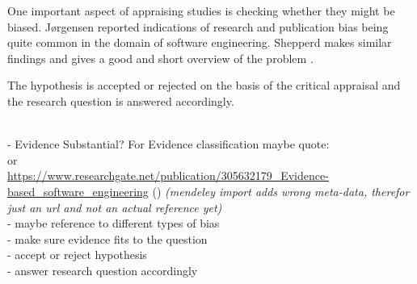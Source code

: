 One important aspect of appraising studies is checking whether they might be biased. J{\o}rgensen \etal \cite{Jorgensen2016} reported indications of research and publication bias being quite common in the domain of software engineering. Shepperd makes similar findings and gives a good and short overview of the problem \cite{Shepperd2015}.

The hypothesis is accepted or rejected on the basis of the critical appraisal and the research question is answered accordingly.

\\
- Evidence Substantial? For Evidence classification maybe quote:\\
\cite{Wohlin2013EvidenceProfile} or \\
\url{https://www.researchgate.net/publication/305632179_Evidence-based_software_engineering} () \textit{(mendeley import adds wrong meta-data, therefor just an url and not an actual reference yet)}\\
- maybe reference to different types of bias\\
- make sure evidence fits to the question\\
- accept or reject hypothesis\\
- answer research question accordingly\\
